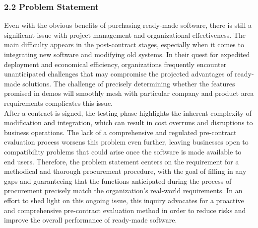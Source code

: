 \documentclass[letterpaper, 11pt]{report}
\begin{document}
\subsubsection*{2.2 Problem Statement}
\normalsize {Even with the obvious benefits of purchasing ready-made software, there is still a significant issue with project management and organizational effectiveness. The main difficulty appears in the post-contract stages, especially when it comes to integrating new software and modifying old systems. In their quest for expedited deployment and economical efficiency, organizations frequently encounter unanticipated challenges that may compromise the projected advantages of ready-made solutions. The challenge of precisely determining whether the features promised in demos will smoothly mesh with particular company and product area requirements complicates this issue.\\

After a contract is signed, the testing phase highlights the inherent complexity of modification and integration, which can result in cost overruns and disruptions to business operations. The lack of a comprehensive and regulated pre-contract evaluation process worsens this problem even further, leaving businesses open to compatibility problems that could arise once the software is made available to end users. Therefore, the problem statement centers on the requirement for a methodical and thorough procurement procedure, with the goal of filling in any gaps and guaranteeing that the functions anticipated during the process of procurement precisely match the organization's real-world requirements. In an effort to shed light on this ongoing issue, this inquiry advocates for a proactive and comprehensive pre-contract evaluation method in order to reduce risks and improve the overall performance of ready-made software.\\
 }
\end{document}
